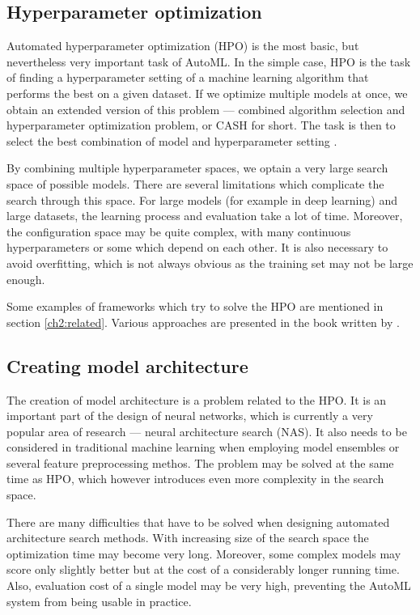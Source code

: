 \subsection{Hyperparameter optimization}
Automated hyperparameter optimization (HPO) is the most basic, but nevertheless
very important task of AutoML. In the simple case, HPO is the task of finding
a hyperparameter setting of a machine learning algorithm that performs
the best on a given dataset. If we optimize multiple models at once, we obtain
an extended version of this problem --- combined algorithm selection and
hyperparameter optimization problem, or CASH for short. The task is then to
select the best combination of model and hyperparameter setting
\citep{DBLP:journals/corr/abs-1208-3719}.

By combining multiple hyperparameter spaces, we optain a very large search
space of possible models. There are several limitations which complicate the
search through this space. For large models (for example in deep learning)
and large datasets, the learning process and evaluation take a lot of time.
Moreover, the configuration space may be quite complex, with many continuous
hyperparameters or some which depend on each other. It is also necessary to
avoid overfitting, which is not always obvious as the training set may not be
large enough.

Some examples of frameworks which try to solve the HPO are mentioned in section
\ref{ch2:related}. Various approaches are presented in the book written by
\cite{automl_book}.

\subsection{Creating model architecture} \label{sec:modelarch}
The creation of model architecture is a problem related to the HPO. It is an
important part of the design of neural networks, which is currently a very
popular area of research --- neural architecture search (NAS). It also needs
to be considered in traditional machine learning when employing model ensembles
or several feature preprocessing methos.
The problem may be solved at the same time as HPO, which however introduces
even more complexity in the search space.

There are many difficulties that have to be solved when designing automated
architecture search methods. With increasing size of the search space 
the optimization time may become very long.
Moreover, some complex models may score only slightly better
but at the cost of a considerably longer running time. Also, evaluation cost of
a single model may be very high, preventing the AutoML system from being usable
in practice.

